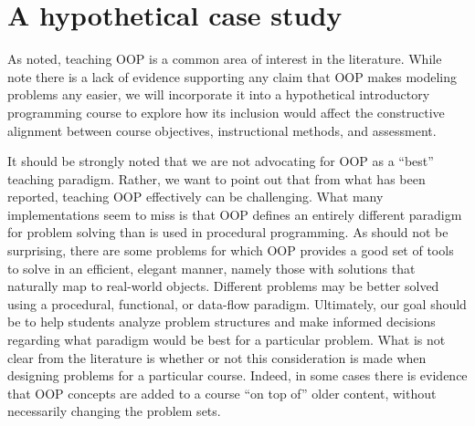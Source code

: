 \documentclass[12pt]{article}
\begin{document}
\section*{A hypothetical case study}
As noted, teaching OOP is a common area of interest in the
literature. While \citeauthor{robins_learning_2003} note there is a
lack of evidence supporting any claim that OOP makes modeling problems
any easier\autocite{robins_learning_2003}, we will incorporate it into
a hypothetical introductory programming course to explore how its
inclusion would affect the constructive alignment between course
objectives, instructional methods, and assessment.

It should be strongly noted that we are not advocating for OOP as a
``best'' teaching paradigm. Rather, we want to point out that from
what has been reported, teaching OOP effectively can be
challenging. What many implementations seem to miss is that OOP
defines an entirely different paradigm for problem solving than is
used in procedural programming\autocite{kolling_problem_1999}. As
should not be surprising, there are some problems for which OOP
provides a good set of tools to solve in an efficient, elegant manner,
namely those with solutions that naturally map to real-world
objects\autocite{raymond_art_2003}. Different problems may be better
solved using a procedural, functional, or data-flow
paradigm\autocite{kay_history_1996,felleisen_functional_2009,crestani_experience_2010}. Ultimately,
our goal should be to help students analyze problem structures and
make informed decisions regarding what paradigm would be best for a
particular problem. What is not clear from the literature is whether
or not this consideration is made when designing problems for a
particular course. Indeed, in some cases there is evidence that OOP
concepts are added to a course ``on top of'' older content, without
necessarily changing the problem
sets\autocite{kolling_problem_1999,vilner_fundamental_2007}.
\end{document}
